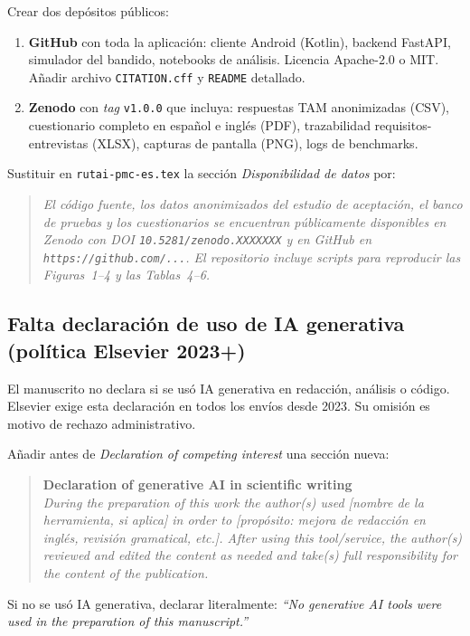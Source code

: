 \documentclass[11pt,a4paper]{article}
\begin{document}
\begin{abordaje}
Crear dos dep\'ositos p\'ublicos:

\begin{enumerate}
  \item \textbf{GitHub} con toda la aplicaci\'on: cliente Android (Kotlin), backend FastAPI, simulador del bandido, notebooks de an\'alisis. Licencia Apache-2.0 o MIT. A\~nadir archivo \texttt{CITATION.cff} y \texttt{README} detallado.
  \item \textbf{Zenodo} con \emph{tag} \texttt{v1.0.0} que incluya: respuestas TAM anonimizadas (CSV), cuestionario completo en espa\~nol e ingl\'es (PDF), trazabilidad requisitos-entrevistas (XLSX), capturas de pantalla (PNG), logs de benchmarks.
\end{enumerate}

Sustituir en \texttt{rutai-pmc-es.tex} la secci\'on \emph{Disponibilidad de datos} por:
\begin{quote}\small
\emph{El c\'odigo fuente, los datos anonimizados del estudio de aceptaci\'on, el banco de pruebas y los cuestionarios se encuentran p\'ublicamente disponibles en Zenodo con DOI \texttt{10.5281/zenodo.XXXXXXX} y en GitHub en \texttt{https://github.com/...}. El repositorio incluye scripts para reproducir las Figuras~1--4 y las Tablas~4--6.}
\end{quote}
\end{abordaje}

\subsection{Falta declaraci\'on de uso de IA generativa (pol\'itica Elsevier 2023+)}

\begin{deficiencia}[M.6 --- Deficiencia]
El manuscrito no declara si se us\'o IA generativa en redacci\'on, an\'alisis o c\'odigo. Elsevier exige esta declaraci\'on en todos los env\'ios desde 2023. Su omisi\'on es motivo de rechazo administrativo.
\end{deficiencia}

\begin{abordaje}
A\~nadir antes de \emph{Declaration of competing interest} una secci\'on nueva:

\begin{quote}\small
\textbf{Declaration of generative AI in scientific writing}\\
\emph{During the preparation of this work the author(s) used [nombre de la herramienta, si aplica] in order to [prop\'osito: mejora de redacci\'on en ingl\'es, revisi\'on gramatical, etc.]. After using this tool/service, the author(s) reviewed and edited the content as needed and take(s) full responsibility for the content of the publication.}
\end{quote}

Si no se us\'o IA generativa, declarar literalmente: \emph{``No generative AI tools were used in the preparation of this manuscript.''}
\end{abordaje}
\end{document}
